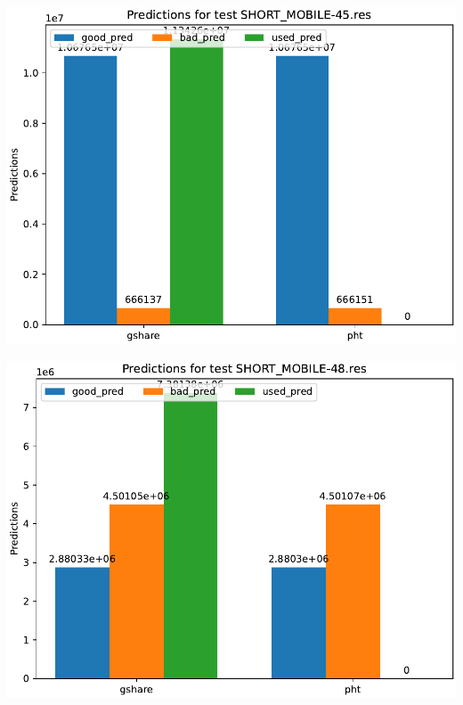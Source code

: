 \documentclass[a4paper]{article}
\begin{document}
\begin{minipage}{.48\linewidth}
\includegraphics[width=\linewidth]{graphs/dual-predictor/preds_SHORT_MOBILE-45.res.pdf}
\end{minipage}%
\hfill
\begin{minipage}{.48\linewidth}
\includegraphics[width=\linewidth]{graphs/dual-predictor/preds_SHORT_MOBILE-48.res.pdf}
\end{minipage}
\end{document}
